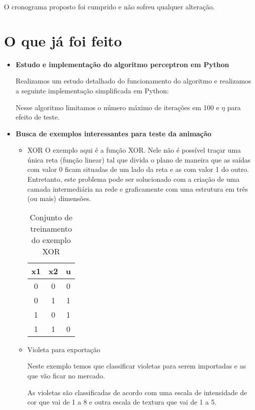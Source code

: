 \documentclass[brazil, a4paper]{article}
\begin{document}
O cronograma proposto foi cumprido e não sofreu qualquer alteração.

\section{O que já foi feito}

\begin{itemize}
\item {\bf Estudo e implementação do algoritmo perceptron em Python}

Realizamos um estudo detalhado do funcionamento do algoritmo  e realizamos a seguinte implementação simplificada em Python:



Nesse algoritmo limitamos o número máximo de iterações em 100 e $\eta$ para efeito de teste.

\item {\bf Busca de exemplos interessantes para teste da animação}

\begin{itemize}
\item XOR
	O exemplo aqui é a função XOR. Nele não é possível traçar uma única reta (função linear) tal que divida o plano de maneira que as saídas com valor 0 ficam situadas de um lado da reta e as com valor 1 do outro. Entretanto, este problema pode ser solucionado com a criação de uma camada intermediária na rede e graficamente com uma estrutura em três (ou mais) dimensões.
	\newpage
		\begin{table}[h]
			\centering
			\begin{tabular}{|c|c|c|}
			\hline
			x1 & x2 & u \\ \hline
			0 & 0 & 0 \\
			0 & 1 & 1 \\
			1 & 0 & 1 \\
			1 & 1 & 0 \\ \hline
			\end{tabular}
			\caption{Conjunto de treinamento do exemplo XOR}
		\end{table}
		
	\item Violeta para exportação
	
	Neste exemplo temos que classificar violetas para serem importadas e as que vão ficar no mercado. 
	
	As violetas são classificadas de acordo com uma escala de intensidade de cor que vai de 1 a 8 e outra escala de textura que vai de 1 a 5.
	

\end{itemize}
\end{itemize}
\end{document}
